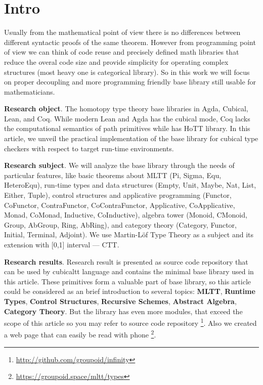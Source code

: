 \documentclass{article}
\begin{document}
\newpage
\tableofcontents

\newpage
\section{Intro}

Usually from the mathematical point of view there is no differences between
different syntactic proofs of the same theorem. However from programming point of view
we can think of code reuse and precisely defined math libraries that reduce
the overal code size and provide simplicity for operating complex
structures (most heavy one is categorical library). So in this work we will focus
on proper decoupling and more programming friendly base library still usable
for mathematicians.

{\bf Research object}. The homotopy type theory base libraries in Agda, Cubical, Lean, and Coq.
While modern Lean and Agda has the cubical mode, Coq lacks the computational semantics of path primitives
while has HoTT library. In this article, we unveil the practical implementation of the
base library for cubical type checkers with respect to target run-time environments.

{\bf Research subject}. We will analyze the base library through the needs of particular features,
like basic theorems about MLTT (Pi, Sigma, Equ, HeteroEqu), run-time types and data
structures (Empty, Unit, Maybe, Nat, List, Either, Tuple), control structures and applicative programming
(Functor, CoFunctor, ContraFunctor, CoContraFunctor, Applicative, CoApplicative, Monad,
CoMonad, Inductive, CoInductive), algebra tower (Monoid, CMonoid, Group, AbGroup, Ring, AbRing),
and category theory (Category, Functor, Initial, Terminal, Adjoint).
We use Martin-Löf Type Theory as a subject and its extension with [0,1] interval --- CTT.

{\bf Research results}. Research result is presented as source code repository that can be used by
cubicaltt language and contains the minimal base library used in this article.
These primitives form a valuable part of base library, so this article could be
considered as an brief introduction to several topics: {\bf MLTT}, {\bf Runtime Types},
{\bf Control Structures},  {\bf Recursive Schemes},
{\bf Abstract Algebra}, {\bf Category Theory}.
But the library has even more modules, that
exceed the scope of this article so you may refer to source code
repository \footnote{\url{http://github.com/groupoid/infinity}}.
Also we created a web page that can easily be read with phone \footnote{\url{https://groupoid.space/mltt/types}}.
\end{document}

